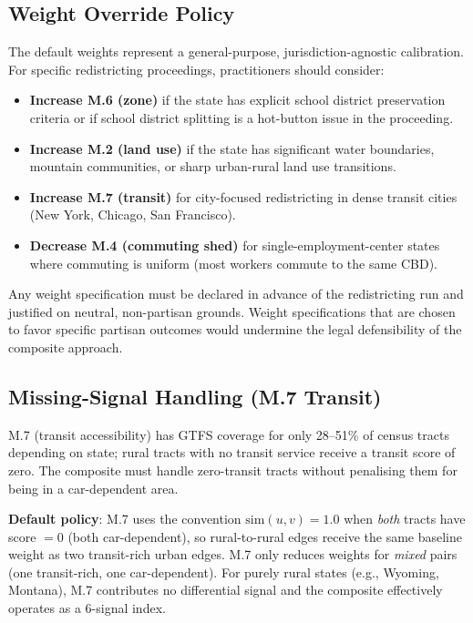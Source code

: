 \subsection{Weight Override Policy}

The default weights represent a general-purpose, jurisdiction-agnostic
calibration.
For specific redistricting proceedings, practitioners should consider:

\begin{itemize}
  \item \textbf{Increase M.6 (zone)} if the state has explicit school district
    preservation criteria or if school district splitting is a hot-button
    issue in the proceeding.
  \item \textbf{Increase M.2 (land use)} if the state has significant water
    boundaries, mountain communities, or sharp urban-rural land use transitions.
  \item \textbf{Increase M.7 (transit)} for city-focused redistricting in
    dense transit cities (New York, Chicago, San Francisco).
  \item \textbf{Decrease M.4 (commuting shed)} for single-employment-center
    states where commuting is uniform (most workers commute to the same CBD).
\end{itemize}

Any weight specification must be declared in advance of the redistricting run
and justified on neutral, non-partisan grounds.
Weight specifications that are chosen to favor specific partisan outcomes
would undermine the legal defensibility of the composite approach.

\subsection{Missing-Signal Handling (M.7 Transit)}

M.7 (transit accessibility) has GTFS coverage for only 28--51\% of census tracts
depending on state; rural tracts with no transit service receive a transit score
of zero.
The composite must handle zero-transit tracts without penalising them for being
in a car-dependent area.

\textbf{Default policy}: M.7 uses the convention $\mathrm{sim}(u,v) = 1.0$
when \emph{both} tracts have score $= 0$ (both car-dependent), so rural-to-rural
edges receive the same baseline weight as two transit-rich urban edges.
M.7 only reduces weights for \emph{mixed} pairs (one transit-rich, one car-dependent).
For purely rural states (e.g., Wyoming, Montana), M.7 contributes no differential
signal and the composite effectively operates as a 6-signal index.

